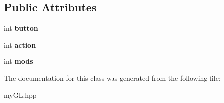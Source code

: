 \subsection*{Public Attributes}
\begin{DoxyCompactItemize}
\item 
\hypertarget{classMouseButton_ada6d6e1d81eaedf7092a8617af6ede6b}{}int {\bfseries button}\label{classMouseButton_ada6d6e1d81eaedf7092a8617af6ede6b}

\item 
\hypertarget{classMouseButton_a7f22ddcecc4bfe282f7c8b150e28704b}{}int {\bfseries action}\label{classMouseButton_a7f22ddcecc4bfe282f7c8b150e28704b}

\item 
\hypertarget{classMouseButton_a1fa333819593583ccc090db9330018ad}{}int {\bfseries mods}\label{classMouseButton_a1fa333819593583ccc090db9330018ad}

\end{DoxyCompactItemize}


The documentation for this class was generated from the following file\+:\begin{DoxyCompactItemize}
\item 
my\+G\+L.\+hpp\end{DoxyCompactItemize}
